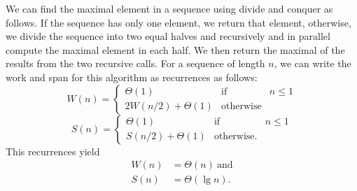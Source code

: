 \begin{cluster}
\label{grp:xmpl:design::dc::maximal-element}

\begin{example}
\label{xmpl:design::dc::maximal-element}
We can find the maximal element in a sequence using divide and conquer
as follows.
If the sequence has only one element, we return that element,
otherwise, we divide the sequence into two equal halves and
recursively and in parallel compute the maximal element in each half.
We then return the maximal of the results from the two recursive
calls.
For a sequence of length $n$, we can write the work and span for this
algorithm as recurrences as follows:
\[
W(n) = \left\{
\begin{array}{lll}
\Theta(1) & \mbox{if} & n \le 1
\\
2W(n/2) + \Theta(1) &  \mbox{otherwise}
\end{array}
\right.
\]
\[
S(n) = \left\{
\begin{array}{lll}
\Theta(1) & \mbox{if} & n \le 1
\\
S(n/2) + \Theta(1) &  \mbox{otherwise}.
\end{array}
\right.
\]
This recurrences yield 
\[ \begin{align*}
W(n) & = \Theta(n)~\mbox{and}
\\
S(n) & = \Theta(\lg{n}).
\end{align*} \]

\end{example}
\end{cluster}

